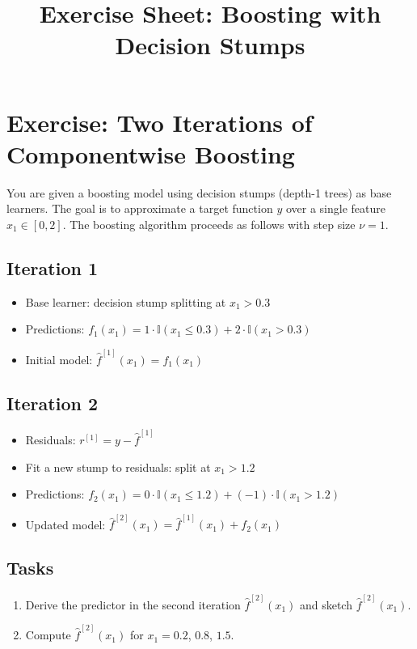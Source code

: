 \documentclass[a4paper,11pt]{article}
\title{Exercise Sheet: Boosting with Decision Stumps}
\date{}
\begin{document}
\maketitle

\section*{Exercise: Two Iterations of Componentwise Boosting}

You are given a boosting model using decision stumps (depth-1 trees) as base learners. The goal is to approximate a target function $y$ over a single feature $x_1 \in [0, 2]$. The boosting algorithm proceeds as follows with step size $\nu = 1$.

\subsection*{Iteration 1}
\begin{itemize}
    \item Base learner: decision stump splitting at $x_1 > 0.3$
    \item Predictions: $
        f_1(x_1) = 1 \cdot \mathbb{I}(x_1 \leq 0.3) + 2 \cdot \mathbb{I}(x_1 > 0.3)$
    \item Initial model: $\hat{f}^{[1]}(x_1) = f_1(x_1)$
\end{itemize}

\subsection*{Iteration 2}
\begin{itemize}
    \item Residuals: $r^{[1]} = y - \hat{f}^{[1]}$
    \item Fit a new stump to residuals: split at $x_1 > 1.2$
    \item Predictions: $f_2(x_1) = 0 \cdot \mathbb{I}(x_1 \leq 1.2) + (-1) \cdot \mathbb{I}(x_1 > 1.2)$
    \item Updated model: $\hat{f}^{[2]}(x_1) = \hat{f}^{[1]}(x_1) + f_2(x_1)$
\end{itemize}


\subsection*{Tasks}
\begin{enumerate}
    \item Derive the predictor in the second iteration $\hat{f}^{[2]}(x_1)$ and sketch $\hat{f}^{[2]}(x_1)$.
    \item Compute $\hat{f}^{[2]}(x_1)$ for $x_1 = 0.2$, $0.8$, $1.5$.
\end{enumerate}
\end{document}
